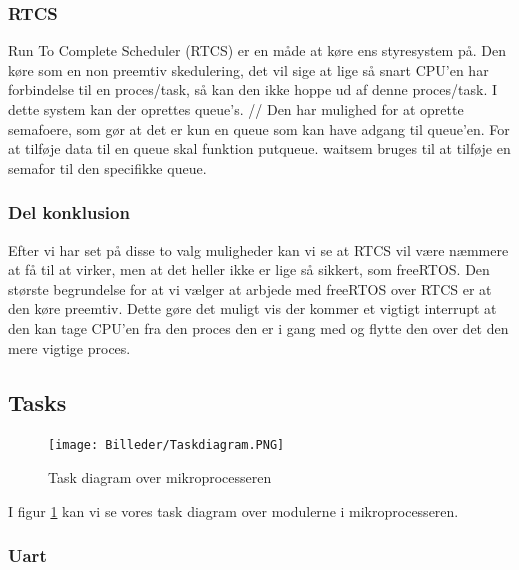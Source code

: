\subsubsection{RTCS}

Run To Complete Scheduler (RTCS) er en måde at køre ens styresystem på. Den køre som en non preemtiv skedulering, det vil sige at lige så snart CPU'en har forbindelse til en proces/task, så kan den ikke hoppe ud af denne proces/task. I dette system kan der oprettes queue's.
//
Den har mulighed for at oprette semafoere, som gør at det er kun en queue som kan have adgang til queue'en. For at tilføje data til en queue skal funktion put\textunderscore queue. wait\textunderscore sem bruges til at tilføje en semafor til den specifikke queue.

\subsubsection{Del konklusion}

Efter vi har set på disse to valg muligheder kan vi se at RTCS vil være næmmere at få til at virker, men at det heller ikke er lige så sikkert, som freeRTOS. Den største begrundelse for at vi vælger at arbjede med freeRTOS over RTCS er at den køre preemtiv. Dette gøre det muligt vis der kommer et vigtigt interrupt at den kan tage CPU'en fra den proces den er i gang med og flytte den over det den mere vigtige proces.

\subsection{Tasks}

\begin{figure}[H]
			\begin{center}
			\texttt{[image: Billeder/Taskdiagram.PNG]}
			\end{center}
			\caption{Task diagram over mikroprocesseren}
			\label{fig:Taskdiagram}
\end{figure}

I figur \ref{fig:Taskdiagram} kan vi se vores task diagram over modulerne i mikroprocesseren.

\subsubsection{Uart}

